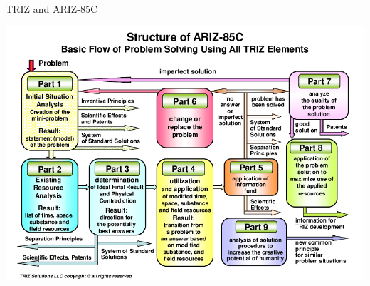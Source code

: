 \documentclass[11pt]{beamer}
\begin{document}
\begin{frame}{TRIZ and ARIZ-85C}

  
\end{frame}

\begin{frame}
  \begin{center}
    \includegraphics[width=\textwidth]{ARIZ-Workflow.png}
  \end{center}
\end{frame}
\end{document}
